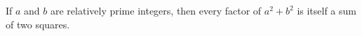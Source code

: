 If $a$ and $b$ are relatively prime integers, then every factor of $a^2 + b^2$ is itself a sum of two squares.
